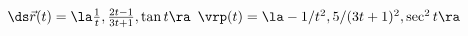{$\ds \vec r(t) = \la \frac 1t, \frac {2t-1}{3t+1}, \tan t\ra$
}
{
$\vrp(t) = \la -1/t^2, 5/(3t+1)^2, \sec^2 t\ra$
}

